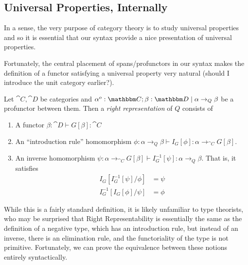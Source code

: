 \documentclass{article}
\begin{document}
\subsection{Universal Properties, Internally}

In a sense, the very purpose of category theory is to study universal
properties and so it is essential that our syntax provide a nice
presentation of universal properties.

Fortunately, the central placement of spans/profunctors in our syntax
makes the definition of a functor satisfying a universal property very
natural (should I introduce the unit category earlier?).

\begin{definition}
  Let $\cat C, \cat D$ be categories and $\alpha^o : \cat C;\beta :
  \cat D \pipe \alpha \to_{Q} \beta$ be a profunctor between them. Then a \emph{right
    representation} of $Q$ consists of
  \begin{enumerate}
  \item A functor $\beta : \cat D \vdash G[\beta] : \cat C$
  \item An ``introduction rule'' homomorphism $\phi: \alpha \to_{Q}
    \beta \vdash I_G[\phi] : \alpha \to_{\cat C} G[\beta]$.
  \item An inverse homomorphism $\psi: \alpha \to_{\cat C} G[\beta]
    \vdash I_G^{-1}[\psi] : \alpha \to_{Q} \beta$. That is, it satisfies
    \begin{align*}
      I_G[I_G^{-1}[\psi]/\phi] &= \psi\\
      I_G^{-1}[I_G[\phi]/\psi] &= \phi
    \end{align*}
  \end{enumerate}
\end{definition}

While this is a fairly standard definition, it is likely unfamiliar to
type theorists, who may be surprised that Right Representability is
essentially the same as the definition of a negative type, which has
an introduction rule, but instead of an inverse, there is an
elimination rule, and the functoriality of the type is not primitive.
Fortunately, we can prove the equivalence between these notions
entirely syntactically.
\end{document}
